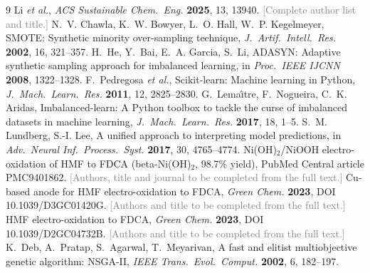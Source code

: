 \documentclass[11pt,a4paper]{article}
\begin{document}
\begin{thebibliography}{9}
 Li \textit{et al.}, \textit{ACS Sustainable Chem.\ Eng.} \textbf{2025}, 13, 13940.
\textcolor{gray}{[Complete author list and title.]}
 N.~V. Chawla, K.~W. Bowyer, L.~O. Hall, W.~P. Kegelmeyer, SMOTE: Synthetic
minority over-sampling technique, \textit{J.\ Artif.\ Intell.\ Res.} \textbf{2002}, 16, 321--357.
 H.~He, Y.~Bai, E.~A. Garcia, S.~Li, ADASYN: Adaptive synthetic sampling approach
for imbalanced learning, in \textit{Proc.\ IEEE IJCNN} \textbf{2008}, 1322--1328.
 F.~Pedregosa \textit{et al.}, Scikit-learn: Machine learning in Python,
\textit{J.\ Mach.\ Learn.\ Res.} \textbf{2011}, 12, 2825--2830.
 G.~Lema\^{\i}tre, F.~Nogueira, C.~K. Aridas, Imbalanced-learn: A Python
toolbox to tackle the curse of imbalanced datasets in machine learning, \textit{J.\ Mach.\ Learn.\
Res.} \textbf{2017}, 18, 1--5.
 S.~M. Lundberg, S.-I. Lee, A unified approach to interpreting model
predictions, in \textit{Adv.\ Neural Inf.\ Process.\ Syst.} \textbf{2017}, 30, 4765--4774.
\bibitem{lit1} Ni(OH)$_2$/NiOOH electro-oxidation of HMF to FDCA (beta-Ni(OH)$_2$, 98.7\% yield),
PubMed Central article PMC9401862. \textcolor{gray}{[Authors, title and journal to be completed from the full text.]}
\bibitem{lit2} Cu-based anode for HMF electro-oxidation to FDCA, \textit{Green Chem.} \textbf{2023},
DOI 10.1039/D3GC01420G. \textcolor{gray}{[Authors and title to be completed from the full text.]}
\bibitem{lit3} HMF electro-oxidation to FDCA, \textit{Green Chem.} \textbf{2023},
DOI 10.1039/D2GC04732B. \textcolor{gray}{[Authors and title to be completed from the full text.]}
\bibitem{deb2002} K.~Deb, A.~Pratap, S.~Agarwal, T.~Meyarivan, A fast and elitist multiobjective
genetic algorithm: NSGA-II, \textit{IEEE Trans.\ Evol.\ Comput.} \textbf{2002}, 6, 182--197.
\end{thebibliography}
\end{document}
